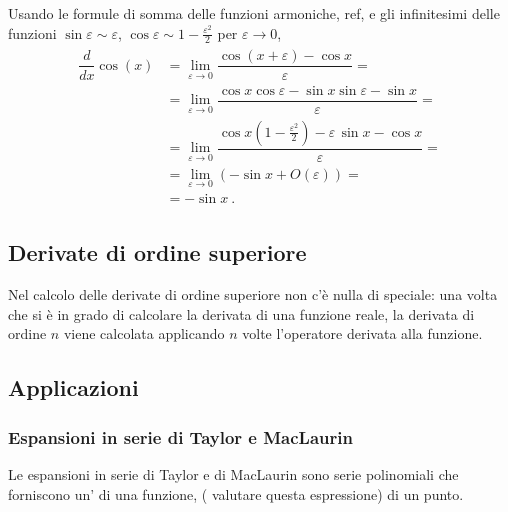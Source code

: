 \documentclass[letterpaper,10pt,english]{jupyterBook}
\begin{document}
\sphinxAtStartPar
Usando le formule di somma delle funzioni armoniche,  ref, e gli infinitesimi delle funzioni \(\sin \varepsilon \sim \varepsilon\), \(\cos \varepsilon \sim 1 - \frac{\varepsilon^2}{2}\) per \(\varepsilon \rightarrow 0\),
\begin{equation*}
\begin{split}\begin{aligned}
  \dfrac{d}{dx} \cos(x) 
  & = \lim_{\varepsilon \rightarrow 0}  \dfrac{\cos(x+\varepsilon) - \cos x}{\varepsilon} = \\
  & = \lim_{\varepsilon \rightarrow 0} \dfrac{\cos x \cos \varepsilon - \sin x \sin \varepsilon - \sin x}{\varepsilon} = \\
  & = \lim_{\varepsilon \rightarrow 0} \dfrac{\cos x \left( 1 - \frac{\varepsilon^2}{2} \right) - \varepsilon \, \sin x - \cos x}{\varepsilon} = \\
  & = \lim_{\varepsilon \rightarrow 0} \left( - \sin x + O(\varepsilon) \right) = \\
  & = - \sin x \ .
\end{aligned}\end{split}
\end{equation*}

\subsection{Derivate di ordine superiore}
\label{\detokenize{ch/infinitesimal_calculus/derivatives:derivate-di-ordine-superiore}}\label{\detokenize{ch/infinitesimal_calculus/derivatives:infinitesimal-calculus-derivatives-higher}}
\sphinxAtStartPar
Nel calcolo delle derivate di ordine superiore non c’è nulla di speciale: una volta che si è in grado di calcolare la derivata di una funzione reale, la derivata di ordine \(n\) viene calcolata applicando \(n\) volte l’operatore derivata alla funzione.


\subsection{Applicazioni}
\label{\detokenize{ch/infinitesimal_calculus/derivatives:applicazioni}}\label{\detokenize{ch/infinitesimal_calculus/derivatives:infinitesimal-calculus-derivatives-applications}}

\subsubsection{Espansioni in serie di Taylor e MacLaurin}
\label{\detokenize{ch/infinitesimal_calculus/derivatives:espansioni-in-serie-di-taylor-e-maclaurin}}\label{\detokenize{ch/infinitesimal_calculus/derivatives:infinitesimal-calculus-derivatives-taylor}}
\sphinxAtStartPar
Le espansioni in serie di Taylor e di MacLaurin sono serie polinomiali che forniscono un’ di una funzione,  ( valutare questa espressione) di un punto.
\end{document}
